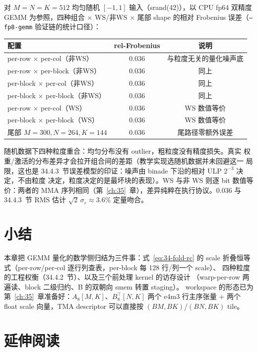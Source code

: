 对 $M{=}N{=}K{=}512$ 均匀随机 $[-1,1]$ 输入（srand(42)），以 CPU fp64 双精度
GEMM 为参照，四种组合 $\times$ WS/非WS $\times$ 尾部 shape 的相对 Frobenius
误差（\texttt{--fp8-gemm} 验证链的统计口径）：

\begin{center}
\footnotesize
\begin{tabular}{lcc}
\toprule
配置 & rel-Frobenius & 说明 \\
\midrule
per-row $\times$ per-col（非WS） & 0.036 & 与粒度无关的量化噪声底 \\
per-row $\times$ per-block（非WS） & 0.036 & 同上 \\
per-block $\times$ per-col（非WS） & 0.036 & 同上 \\
per-block $\times$ per-block（非WS） & 0.036 & 同上 \\
per-row $\times$ per-col（WS） & 0.036 & WS 数值等价 \\
per-block $\times$ per-block（WS） & 0.036 & WS 数值等价 \\
尾部 $M{=}300,N{=}264,K{=}144$ & 0.036 & 尾路径零额外误差 \\
\bottomrule
\end{tabular}
\end{center}

随机数据下四种粒度重合：均匀分布没有 outlier，粗粒度没有精度损失。真实
权重/激活的分布差异才会拉开组合间的差距（教学实现选随机数据并未回避这一
局限，这也是 34.4.3~节误差模型的印证：噪声由 binade 下沿的相对 ULP $2^{-3}$ 决定，不由粒度
决定，粒度决定的是最坏块的表现）。WS 与非 WS 则逐 bit 数值等价：两者的
MMA 序列相同（第~\ref{ch:35}~章），差异纯粹在执行协议。$0.036$ 与
34.4.3~节 RMS 估计 $\sqrt{2}\,\sigma_\varepsilon\approx3.6\%$ 定量吻合。

\section{小结}

本章把 GEMM 量化的数学侧归结为三件事：式~\ref{eq:34-fold-rc} 的 scale
折叠恒等式（per-row/per-col 逐行列查表，per-block 每 128 行/列一个 scale）、
四种粒度的工程权衡（34.4.2~节）、以及三个前处理 kernel 的访存设计
（warp-per-row 两遍读、block 二级归约、B 的双朝向 smem 转置 staging）。
workspace 的形态已为第~\ref{ch:35}~章准备好：$A_8[M,K]$、$B_8^{\top}[N,K]$
两个 e4m3 行主序张量 + 两个 float scale 向量，TMA descriptor 可以直接按
$(BM,BK)$/$(BN,BK)$ tile。

\section*{延伸阅读}

